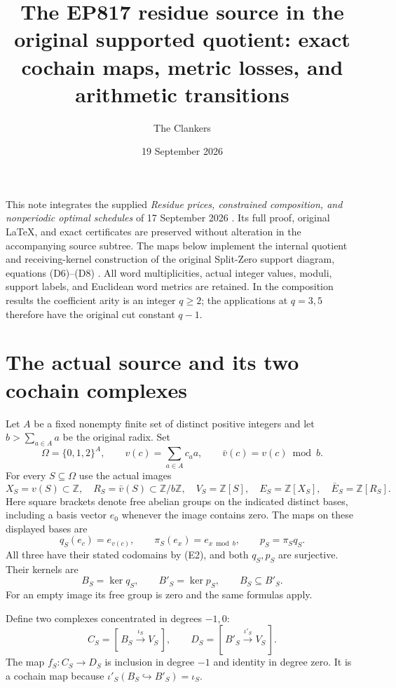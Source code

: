 \documentclass[11pt]{article}
\title{The EP817 residue source in the original supported quotient:
exact cochain maps, metric losses, and arithmetic transitions}
\author{The Clankers}
\date{19 September 2026}
\newcommand{\Z}{\mathbb Z}
\begin{document}
\maketitle

This note integrates the supplied \emph{Residue prices, constrained composition,
and nonperiodic optimal schedules} of 17 September 2026
\cite{continuation}.  Its full proof, original LaTeX, and exact certificates
are preserved without alteration in the accompanying source subtree.
The maps below implement the internal quotient and receiving-kernel construction
of the original Split-Zero support diagram, equations (D6)--(D8)
\cite{support}.  All word multiplicities, actual integer values, moduli,
support labels, and Euclidean word metrics are retained.  In the
composition results the coefficient arity is an integer \(q\geq2\);
the applications at \(q=3,5\) therefore have the original cut constant \(q-1\).

\section{The actual source and its two cochain complexes}

Let \(A\) be a fixed nonempty finite set of distinct positive integers and
let \(b>\sum_{a\in A}a\) be the original radix.  Set
\[
 \Omega=\{0,1,2\}^{A},\qquad
 v(c)=\sum_{a\in A}c_a a,\qquad
 \bar v(c)=v(c)\bmod b .
 \tag{E1}
\]
For every \(S\subseteq\Omega\) use the actual images
\[
 X_S=v(S)\subset\Z,\quad R_S=\bar v(S)\subset\Z/b\Z,\quad
 V_S=\Z[S],\quad E_S=\Z[X_S],\quad \bar E_S=\Z[R_S].
 \tag{E2}
\]
Here square brackets denote free abelian groups on the indicated distinct
bases, including a basis vector \(e_0\) whenever the image contains zero.
The maps on these displayed bases are
\[
 q_S(e_c)=e_{v(c)},\qquad
 \pi_S(e_x)=e_{x\bmod b},\qquad p_S=\pi_Sq_S.
 \tag{E3}
\]
All three have their stated codomains by (E2), and both \(q_S,p_S\) are
surjective.  Their kernels are
\[
 B_S=\ker q_S,\qquad B'_S=\ker p_S,\qquad B_S\subseteq B'_S .
 \tag{E4}
\]
For an empty image its free group is zero and the same formulas apply.

Define two complexes concentrated in degrees \(-1,0\):
\[
 C_S=[\,B_S\overset{\iota_S}{\longrightarrow}V_S\,],\qquad
 D_S=[\,B'_S\overset{\iota'_S}{\longrightarrow}V_S\,].
 \tag{E5}
\]
The map \(f_S:C_S\to D_S\) is inclusion in degree \(-1\) and identity
in degree zero.  It is a cochain map because
\(\iota'_S(B_S\hookrightarrow B'_S)=\iota_S\).
\end{document}
